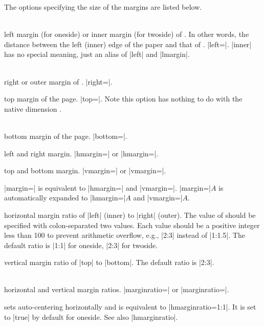 The options specifying the size of the margins are listed below.

\begin{Options}
\item[left\OR lmargin\OR inner]~\\
   left margin (for oneside) or inner margin (for twoside) of 
   . In other words, the distance between the left (inner)
   edge of the paper and that of . |left=|.
   |inner| has no special meaning, just an alias of |left| and |lmargin|.
\item[right\OR rmargin\OR outer]~\\ 
   right or outer margin of . |right=|.
\item[top\OR tmargin] top margin of the page. |top=|.
   Note this option has nothing to do with the native dimension
   .
\item[bottom\OR bmargin]~\\ 
   bottom margin of the page. |bottom=|.
\item[hmargin] left and right margin.
  |hmargin=| or |hmargin=|.
\item[vmargin] top and bottom margin.
  |vmargin=| or |vmargin=|.
\item[margin] |margin=| is equivalent to 
  |hmargin=| and |vmargin=|.
  |margin=|$A$ is automatically expanded to |hmargin=|$A$ and |vmargin=|$A$.
\item[hmarginratio]
  horizontal margin ratio of |left| (inner) to |right| (outer). 
  The value of  should be specified with colon-separated 
  two values. Each value should be a positive integer less than 100
  to prevent arithmetic overflow, e.g., |2:3| instead of |1:1.5|.
  The default ratio is |1:1| for oneside, |2:3| for twoside.
\item[vmarginratio]
   vertical margin ratio of |top| to |bottom|. The default ratio is |2:3|.
\item[marginratio\OR ratio]~\\
   horizontal and vertical margin ratios.
  |marginratio=| or
  |marginratio=|.
\item[hcentering] sets auto-centering horizontally and is
  equivalent to |hmarginratio=1:1|. It is set to |true| by default for
  oneside. See also |hmarginratio|.

\end{Options}
